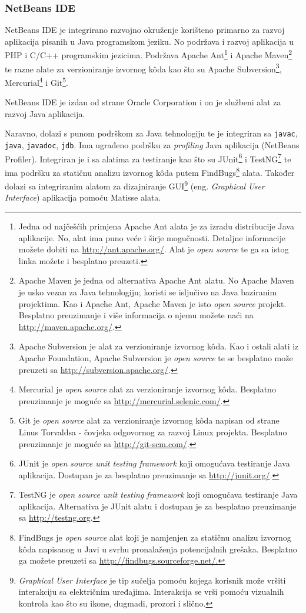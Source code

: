 \subsubsection{NetBeans IDE}
NetBeans IDE je integrirano razvojno okruženje korišteno primarno za razvoj aplikacija pisanih u Java programskom jeziku. No podržava i razvoj aplikacija u PHP i C/C++ programskim jezicima. Podržava Apache Ant\footnote{Jedna od najčešćih primjena Apache Ant alata je za izradu distribucije Java aplikacije. No, alat ima puno veće i širje mogučnosti. Detaljne informacije možete dobiti na \url{http://ant.apache.org/}. Alat je \emph{open source} te ga sa istog linka možete i besplatno preuzeti.} i Apache Maven\footnote{Apache Maven je jedna od alternativa Apache Ant alatu. No Apache Maven je usko vezan za Java tehnologiju; koristi se isljučivo na Java baziranim projektima. Kao i Apache Ant, Apache Maven je isto \emph{open source} projekt. Besplatno preuzimanje i više informacija o njemu možete naći na \url{http://maven.apache.org/}.} te razne alate za verzioniranje izvornog kôda kao što su Apache Subversion\footnote{Apache Subversion je alat za verzioniranje izvornog kôda. Kao i ostali alati iz Apache Foundation, Apache Subversion je \emph{open source} te se besplatno može preuzeti sa \url{http://subversion.apache.org/}.}, Mercurial\footnote{Mercurial je \emph{open source} alat za verzioniranje izvornog kôda. Besplatno preuzimanje je moguće sa \url{http://mercurial.selenic.com/}.} i Git\footnote{Git je \emph{open source} alat za verzioniranje izvornog kôda napisan od strane Linus Torvaldsa - čovjeka odgovornog za razvoj Linux projekta. Besplatno preuzimanje je moguće sa \url{http://git-scm.com/}.}.

\begin{infobox}
    NetBeans IDE je izdan od strane Oracle Corporation i on je službeni alat za razvoj Java aplikacija.
\end{infobox}

Naravno, dolazi s punom podrškom za Java tehnologiju te je integriran sa \texttt{javac}, \texttt{java}, \texttt{javadoc}, \texttt{jdb}. Ima ugrađeno podršku za \emph{profiling} Java aplikacija (NetBeans Profiler). Integriran je i sa alatima za testiranje kao što su JUnit\footnote{JUnit je \emph{open source unit testing framework} koji omogućava testiranje Java aplikacija. Dostupan je za besplatno preuzimanje sa \url{http://junit.org/}.} i TestNG\footnote{TestNG je \emph{open source unit testing framework} koji omogućava testiranje Java aplikacija. Alternativa je JUnit alatu i dostupan je za besplatno preuzimanje sa \url{http://testng.org}.} te ima podršku za statičnu analizu izvornog kôda putem FindBugs\footnote{FindBugs je \emph{open source} alat koji je namjenjen za statičnu analizu izvornog kôda napisanog u Javi u svrhu pronalaženja potencijalnih grešaka. Besplatno ga možete preuzeti sa \url{http://findbugs.sourceforge.net/.}} alata. Također dolazi sa integriranim alatom za dizajniranje GUI\footnote{\emph{Graphical User Interface} je tip sučelja pomoću kojega korisnik može vršiti interakciju sa električnim uređajima. Interakcija se vrši pomoću vizualnih kontrola kao što su ikone, dugmadi, prozori i slično.} (eng. \emph{Graphical User Interface}) aplikacija pomoću Matisse alata.

